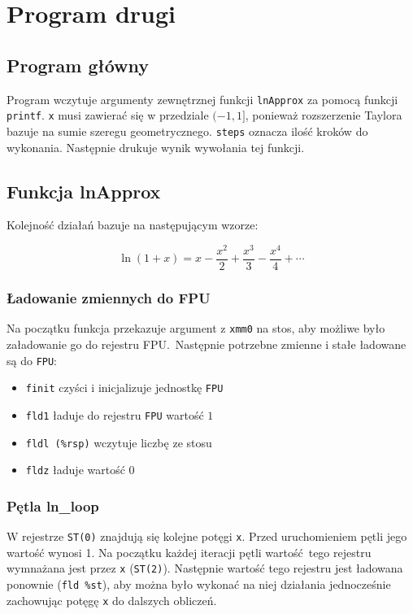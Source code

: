 \documentclass[polish, 11pt]{article}
\begin{document}
\section{Program drugi}
	\subsection{Program główny}
		Program wczytuje argumenty zewnętrznej funkcji \verb|lnApprox| za pomocą funkcji \verb|printf|.
		\verb|x| musi zawierać się w przedziale \((-1,1]\), ponieważ rozszerzenie Taylora bazuje na sumie szeregu geometrycznego.
		\verb|steps| oznacza ilość kroków do wykonania.
		Następnie drukuje wynik wywołania tej funkcji.

		

	\subsection{Funkcja lnApprox}
		Kolejność działań bazuje na następującym wzorze:

		\begin{displaymath}
			\ln(1+x)=x-\frac{x^2}{2}+\frac{x^3}{3}-\frac{x^4}{4}+\cdots	
		\end{displaymath}

		\subsubsection{Ładowanie zmiennych do FPU}
			Na początku funkcja przekazuje argument z \verb|xmm0| na stos, aby możliwe było załadowanie go do rejestru FPU.\ 
			Następnie potrzebne zmienne i stałe ładowane są do \verb|FPU|: 
			\begin{itemize}
				\item \verb|finit| czyści i inicjalizuje jednostkę \verb|FPU|
				\item \verb|fld1| ładuje do rejestru \verb|FPU| wartość \(1\)
				\item \verb|fldl (%rsp)| wczytuje liczbę ze stosu
				\item \verb|fldz| ładuje wartość \(0\)
			\end{itemize}

			

		\subsubsection{Pętla ln\_loop}			
			W rejestrze \verb|ST(0)| znajdują się kolejne potęgi \verb|x|.
			Przed uruchomieniem pętli jego wartość wynosi 1.
			Na początku każdej iteracji pętli wartość tego rejestru wymnażana jest przez \verb|x| (\verb|ST(2)|).
			Następnie wartość tego rejestru jest ładowana ponownie (\verb|fld %st|), aby można było wykonać na niej działania
			jednocześnie zachowując potęgę \verb|x| do dalszych obliczeń.
\end{document}
